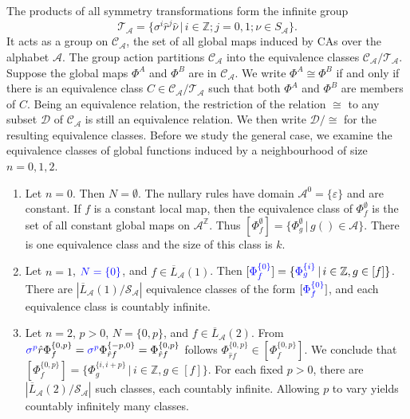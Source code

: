 \documentclass[11pt,a4paper]{article}
\newcommand{\rev}[1]{{\color{blue}#1}}
\newcommand{\rev}[1]{{\color{black}#1}}
\newcommand{\locmark}[1]{\label{#1}\linelabel{line:#1}}
\begin{document}
The products of all symmetry transformations form the infinite group
\[
\mathcal{T}_\mathcal{A} = \{ \sigma^i \hat{r}^j \hat{\nu} \, | \, i \in \mathbb{Z}; j=0,1; \nu \in S_\mathcal{A} \}.
\]
\rev{It acts as a group on} $\mathcal{C}_\mathcal{A}$, the set of all global maps induced by CAs over the
alphabet $\mathcal{A}$.
The group action partitions $\mathcal{C}_\mathcal{A}$ into the
equivalence classes $\mathcal{C}_\mathcal{A} / \mathcal{T}_\mathcal{A}$.
Suppose the global maps $\Phi^A$ and $\Phi^B$ are in $\mathcal{C}_\mathcal{A}$.
We write $\Phi^A \cong \Phi^B$ if and only if there is an equivalence class
$C \in  \mathcal{C}_\mathcal{A} / \mathcal{T}_\mathcal{A}$ such that
both $\Phi^A$ and $\Phi^B$ are members of $C$.
Being an equivalence relation, the restriction of the relation $\cong$ to
any subset $\mathcal{D}$ of $\mathcal{C}_\mathcal{A}$ is still an equivalence relation.
We then write $\mathcal{D} / {\cong}$ for the resulting equivalence classes.
Before we study the general case, we examine the equivalence classes of global functions induced by
a neighbourhood of size $n=0,1,2$.

\begin{enumerate}

\item Let $n=0$. Then $N=\emptyset$.
\rev{The nullary rules have domain $\mathcal A^0=\{\varepsilon\}$ and are constant.}
If $f$ is a constant local map, then the equivalence class of \rev{$\Phi_f^\emptyset$} is \rev{the set
of all constant global maps on $\mathcal{A}^\mathbb{Z}$.}
Thus $[\Phi^\emptyset_f] = \{ \Phi^\emptyset_g \, | \, g() \in \mathcal{A} \}$.
There is one equivalence class and the size of this class is $k$.

\item Let $n=1$, $\rev{N=\{0\}}$, and $f \in \overline{L}_\mathcal{A}(1)$.
Then $[\rev{\Phi_f^{\{0\}}}] = \{ \rev{\Phi_g^{\{i\}}} \, | \, i \in \mathbb{Z}, g \in [f] \}$.
There are \rev{$|\overline L_\mathcal{A}(1) / \mathcal{S}_{\mathcal A}|$} equivalence classes of the form $[\rev{\Phi_f^{\{0\}}}]$,
and each equivalence class is countably infinite.

\item \rev{\locmark{loc:two-site}Let $n=2$, $p>0$, $N=\{0,p\}$,} and $f \in \overline{L}_\mathcal{A}(2)$.
From
$\rev{\sigma^p}\hat{r}\Phi^{\{0,p\}}_f = \rev{\sigma^p}\Phi^{\{-p,0\}}_{\hat{r}f}
= \Phi^{\{0,p\}}_{\hat{r}f}$
follows $\Phi^{\{0,p\}}_{\hat{r}f} \in [\Phi^{\{0,p\}}_f]$.
We conclude that $[\Phi^{\{0,p\}}_f] = \{ \Phi^{\{i,i+p\}}_g \, | \, i \in \mathbb{Z}, g \in [f] \}$.
\rev{For each fixed $p>0$, there are $|\overline L_{\mathcal A}(2)/\mathcal S_{\mathcal A}|$ such classes, each countably infinite. Allowing $p$ to vary yields countably infinitely many classes.}

\end{enumerate}
\end{document}
